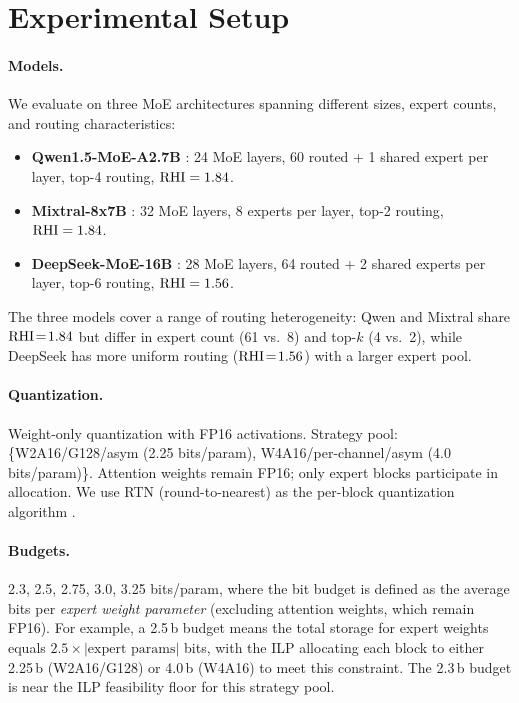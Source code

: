 \section{Experimental Setup}
\label{sec:setup}

\paragraph{Models.}
We evaluate on three MoE architectures spanning different sizes, expert counts, and routing characteristics:
\begin{itemize}
\item \textbf{Qwen1.5-MoE-A2.7B} \citep{bai2023qwen}: 24 MoE layers, 60 routed + 1 shared expert per layer, top-4 routing, $\mathrm{RHI} = 1.84$.
\item \textbf{Mixtral-8x7B} \citep{jiang2024mixtral}: 32 MoE layers, 8 experts per layer, top-2 routing, $\mathrm{RHI} = 1.84$.
\item \textbf{DeepSeek-MoE-16B} \citep{deepseekai2024deepseekv3}: 28 MoE layers, 64 routed + 2 shared experts per layer, top-6 routing, $\mathrm{RHI} = 1.56$.
\end{itemize}
The three models cover a range of routing heterogeneity: Qwen and Mixtral share $\mathrm{RHI}\!=\!1.84$ but differ in expert count (61 vs.\ 8) and top-$k$ (4 vs.\ 2), while DeepSeek has more uniform routing ($\mathrm{RHI}\!=\!1.56$) with a larger expert pool.

\paragraph{Quantization.} Weight-only quantization with FP16 activations. Strategy pool: \{W2A16/G128/asym (2.25 bits/param), W4A16/per-channel/asym (4.0 bits/param)\}. Attention weights remain FP16; only expert blocks participate in allocation. We use RTN (round-to-nearest) as the per-block quantization algorithm \citep{nagel2020adaround}.

\paragraph{Budgets.} 2.3, 2.5, 2.75, 3.0, 3.25 bits/param, where the bit budget is defined as the average bits per \emph{expert weight parameter} (excluding attention weights, which remain FP16). For example, a 2.5\,b budget means the total storage for expert weights equals $2.5 \times |\text{expert params}|$ bits, with the ILP allocating each block to either 2.25\,b (W2A16/G128) or 4.0\,b (W4A16) to meet this constraint. The 2.3\,b budget is near the ILP feasibility floor for this strategy pool.

